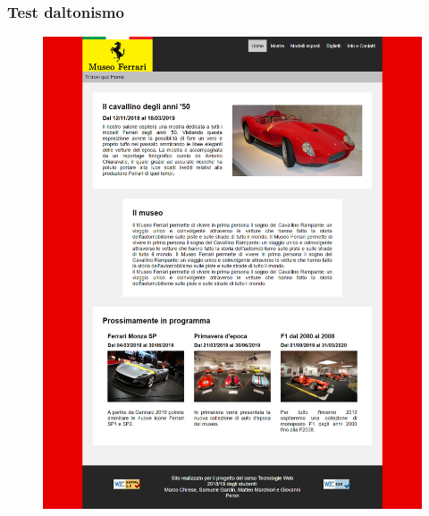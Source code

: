 \subsubsection{Test daltonismo}

\begin{figure}[!h]
	\begin{center}
		\includegraphics[scale=0.144]{Images/original.png}

\end{center}
\end{figure}
